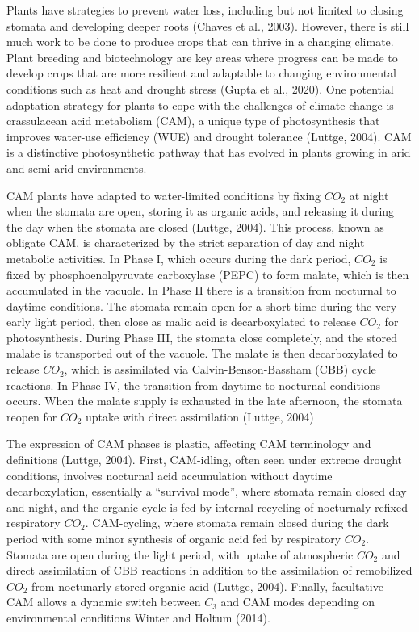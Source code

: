 \documentclass[
  12pt,
  letterpaper,
  DIV=11,
  numbers=noendperiod]{scrartcl}
\begin{document}
Plants have strategies to prevent water loss, including but not limited
to closing stomata and developing deeper roots (Chaves et al., 2003).
However, there is still much work to be done to produce crops that can
thrive in a changing climate. Plant breeding and biotechnology are key
areas where progress can be made to develop crops that are more
resilient and adaptable to changing environmental conditions such as
heat and drought stress (Gupta et al., 2020). One potential adaptation
strategy for plants to cope with the challenges of climate change is
crassulacean acid metabolism (CAM), a unique type of photosynthesis that
improves water-use efficiency (WUE) and drought tolerance (Luttge,
2004). CAM is a distinctive photosynthetic pathway that has evolved in
plants growing in arid and semi-arid environments.

CAM plants have adapted to water-limited conditions by fixing \(CO_2\)
at night when the stomata are open, storing it as organic acids, and
releasing it during the day when the stomata are closed (Luttge, 2004).
This process, known as obligate CAM, is characterized by the strict
separation of day and night metabolic activities. In Phase I, which
occurs during the dark period, \(CO_2\) is fixed by phosphoenolpyruvate
carboxylase (PEPC) to form malate, which is then accumulated in the
vacuole. In Phase II there is a transition from nocturnal to daytime
conditions. The stomata remain open for a short time during the very
early light period, then close as malic acid is decarboxylated to
release \(CO_2\) for photosynthesis. During Phase III, the stomata close
completely, and the stored malate is transported out of the vacuole. The
malate is then decarboxylated to release \(CO_2\), which is assimilated
via Calvin-Benson-Bassham (CBB) cycle reactions. In Phase IV, the
transition from daytime to nocturnal conditions occurs. When the malate
supply is exhausted in the late afternoon, the stomata reopen for
\(CO_2\) uptake with direct assimilation (Luttge, 2004)

The expression of CAM phases is plastic, affecting CAM terminology and
definitions (Luttge, 2004). First, CAM-idling, often seen under extreme
drought conditions, involves nocturnal acid accumulation without daytime
decarboxylation, essentially a ``survival mode'', where stomata remain
closed day and night, and the organic cycle is fed by internal recycling
of nocturnaly refixed respiratory \(CO_2\). CAM-cycling, where stomata
remain closed during the dark period with some minor synthesis of
organic acid fed by respiratory \(CO_2\). Stomata are open during the
light period, with uptake of atmospheric \(CO_2\) and direct
assimilation of CBB reactions in addition to the assimilation of
remobilized \(CO_2\) from noctunarly stored organic acid (Luttge, 2004).
Finally, facultative CAM allows a dynamic switch between \(C_3\) and CAM
modes depending on environmental conditions Winter and Holtum (2014).
\end{document}
